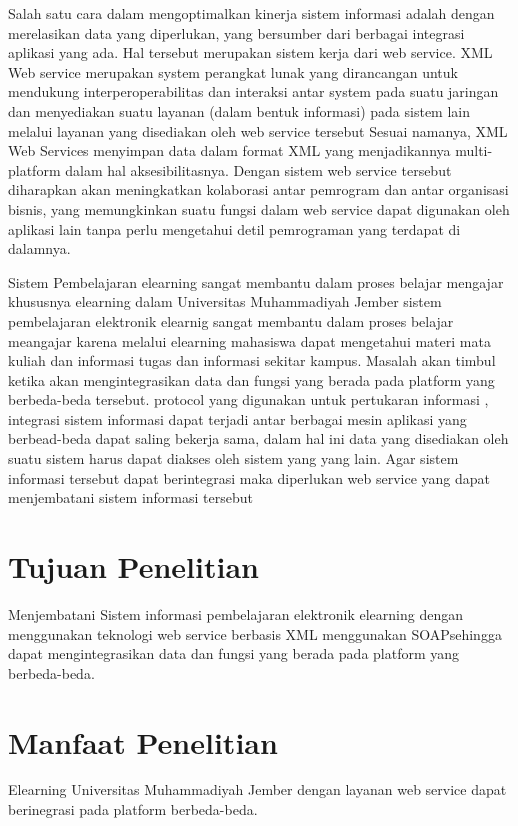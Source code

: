 \documentclass{jtetiproposalskripsi}
\begin{document}
Salah satu cara dalam mengoptimalkan kinerja sistem informasi adalah dengan merelasikan data yang diperlukan, yang bersumber dari berbagai integrasi aplikasi yang ada. Hal tersebut merupakan sistem kerja dari web service. XML Web service merupakan system perangkat lunak yang dirancangan untuk mendukung interperoperabilitas dan interaksi antar system pada suatu jaringan dan menyediakan suatu layanan (dalam bentuk informasi) pada sistem lain melalui layanan yang disediakan oleh web service tersebut Sesuai namanya,  XML Web Services  menyimpan data dalam format XML yang menjadikannya multi-platform  dalam hal aksesibilitasnya. Dengan sistem  web service  tersebut diharapkan akan meningkatkan kolaborasi antar pemrogram dan antar organisasi bisnis, yang memungkinkan suatu fungsi dalam web service  dapat digunakan oleh aplikasi lain tanpa perlu mengetahui detil pemrograman yang terdapat di dalamnya.

Sistem Pembelajaran elearning sangat  membantu dalam proses belajar mengajar khususnya elearning dalam Universitas Muhammadiyah Jember sistem pembelajaran elektronik elearnig sangat membantu dalam proses belajar meangajar karena melalui elearning mahasiswa dapat mengetahui  materi mata kuliah dan informasi tugas dan informasi sekitar kampus. Masalah akan timbul ketika akan mengintegrasikan data dan fungsi yang berada pada  platform yang berbeda-beda tersebut. protocol yang digunakan untuk pertukaran informasi , integrasi sistem informasi dapat terjadi antar berbagai mesin aplikasi yang berbead-beda dapat saling bekerja sama, dalam hal ini data yang disediakan oleh suatu sistem harus dapat diakses oleh sistem yang yang lain. Agar sistem informasi tersebut dapat berintegrasi maka diperlukan web service yang dapat menjembatani sistem informasi tersebut




\section{Tujuan Penelitian}
Menjembatani Sistem informasi pembelajaran elektronik elearning dengan menggunakan teknologi web service berbasis XML menggunakan SOAPsehingga dapat mengintegrasikan data dan fungsi yang berada pada  platform yang berbeda-beda.




\section{Manfaat Penelitian}
Elearning Universitas Muhammadiyah Jember dengan layanan web service dapat berinegrasi pada platform berbeda-beda.
\end{document}
